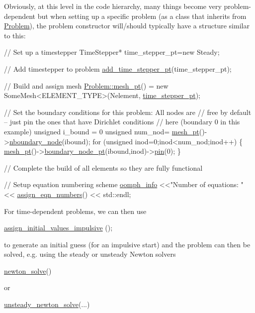 Obviously, at this level in the code hierarchy, many things become very problem-\/dependent but when setting up a specific problem (as a class that inherits from \hyperlink{classoomph_1_1Problem}{Problem}), the problem constructor will/should typically have a structure similar to this\+: 
\begin{DoxyCode}
\textcolor{comment}{// Set up a timestepper}
 TimeStepper* time\_stepper\_pt=\textcolor{keyword}{new} Steady;

\textcolor{comment}{// Add timestepper to problem}
 \hyperlink{classoomph_1_1Problem_a8856eae2daa9cea05e99bfcd4ef340a4}{add\_time\_stepper\_pt}(time\_stepper\_pt);

\textcolor{comment}{// Build and assign mesh}
 \hyperlink{classoomph_1_1Problem_aad122d70a22dc5302cfd5853d3cf3057}{Problem::mesh\_pt}() = \textcolor{keyword}{new} SomeMesh<ELEMENT\_TYPE>(Nelement,
      \hyperlink{classoomph_1_1Problem_acfdb74e8522fa5d486064998e7223fc6}{time\_stepper\_pt});

\textcolor{comment}{// Set the boundary conditions for this problem: All nodes are}
\textcolor{comment}{// free by default -- just pin the ones that have Dirichlet conditions}
\textcolor{comment}{// here (boundary 0 in this example)}
\textcolor{keywordtype}{unsigned} i\_bound = 0
\textcolor{keywordtype}{unsigned} num\_nod= \hyperlink{classoomph_1_1Problem_aad122d70a22dc5302cfd5853d3cf3057}{mesh\_pt}()->\hyperlink{classoomph_1_1Mesh_a034677ceb48c67769acb83f304c84f7d}{nboundary\_node}(ibound);
  \textcolor{keywordflow}{for} (\textcolor{keywordtype}{unsigned} inod=0;inod<num\_nod;inod++)
   \{
     \hyperlink{classoomph_1_1Problem_aad122d70a22dc5302cfd5853d3cf3057}{mesh\_pt}()->\hyperlink{classoomph_1_1Mesh_a2e637d80f84092d1d6977a827fceeca5}{boundary\_node\_pt}(ibound,inod)->\hyperlink{classoomph_1_1Data_a422231c58e423f0b43822827aa334d79}{pin}(0);
   \}

\textcolor{comment}{// Complete the build of all elements so they are fully functional}

 \textcolor{comment}{// Setup equation numbering scheme}
 \hyperlink{namespaceoomph_aec474227917784dc0a255faf289cfc16}{oomph\_info} <<\textcolor{stringliteral}{"Number of equations: "} << \hyperlink{classoomph_1_1Problem_a0df501c6aed60c4938861df776b10119}{assign\_eqn\_numbers}() << std::endl;
\end{DoxyCode}
 For time-\/dependent problems, we can then use 
\begin{DoxyCode}
\hyperlink{classoomph_1_1Problem_a10e5dc4d944dfb2b141918e18e5e3de8}{assign\_initial\_values\_impulsive} (); 
\end{DoxyCode}
 to generate an initial guess (for an impulsive start) and the problem can then be solved, e.\+g. using the steady or unsteady Newton solvers 
\begin{DoxyCode}
\hyperlink{classoomph_1_1Problem_a62a989ae9a9169b9d905f844db59787f}{newton\_solve}() 
\end{DoxyCode}
 or 
\begin{DoxyCode}
\hyperlink{classoomph_1_1Problem_aef22157aadc15a512cca93e4c423ff73}{unsteady\_newton\_solve}(...) 
\end{DoxyCode}
 

